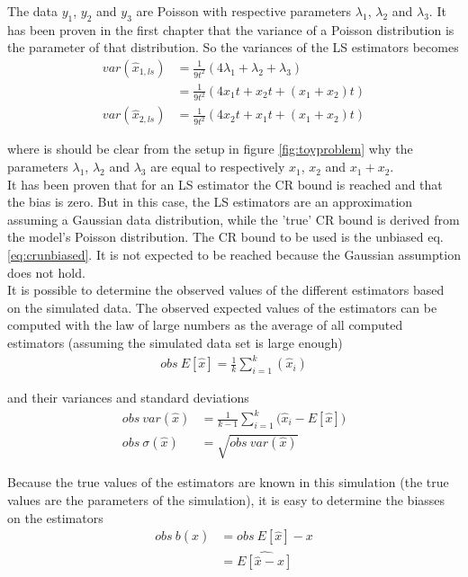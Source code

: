 \documentclass[report,12pt]{report}
\begin{document}
The data $y_1$, $y_2$ and $y_3$ are Poisson with respective parameters $\lambda_1$, $\lambda_2$ and $\lambda_3$. It has been proven in the first chapter that the variance of a Poisson distribution is the parameter of that distribution. So the variances of the LS estimators becomes
\begin{align}
	var(\hat x_{1, ls}) &= \frac{1}{9 t^2} \left( 4 \lambda_1 + \lambda_2 + \lambda_3 \right)
	\nonumber\\
	&= \frac{1}{9 t^2} \left( 
	4 x_{1}t + x_{2}t + 
	(x_{1} + x_{2})t 
	\right)
	\\
	var(\hat x_{2, ls }) &= \frac{1}{9 t^2} \left( 
	4 x_{2}t + x_{1}t + 
	(x_{1} + x_{2})t 
	\right)
\end{align}

where is should be clear from the setup in figure \ref{fig:toyproblem} why the parameters $\lambda_1$, $\lambda_2$ and $\lambda_3$ are equal to respectively $x_1$, $x_2$ and $x_1 + x_2$.\\

It has been proven that for an LS estimator the CR bound is reached and that the bias is zero. But in this case, the LS estimators are an approximation assuming a Gaussian data distribution, while the 'true' CR bound is derived from the model's Poisson distribution. The CR bound to be used is the unbiased eq. \ref{eq:crunbiased}. It is not expected to be reached because the Gaussian assumption does not hold.\\

It is possible to determine the observed values of the different estimators based on the simulated data. The observed expected values of the estimators can be computed with the law of large numbers as the average of all computed estimators (assuming the simulated data set is large enough)
\begin{align}
	obs\ E[\hat x] = \frac{1}{k} \sum_{i=1}^{k} \left(\hat x_i \right)
\end{align}

and their variances and standard deviations
\begin{align}
	obs\ var(\hat x) &= \frac{1}{k-1} \sum_{i=1}^{k}
	\big(\hat x_i - E[\hat x]\big)
	\\
	obs\ \sigma(\hat x) &= \sqrt{obs\ var(\hat x)}
	\label{eq:variance}
\end{align}

Because the true values of the estimators are known in this simulation (the true values are the parameters of the simulation), it is easy to determine the biasses on the estimators
\begin{align}	
	obs\ b(\hat x) &= obs\ E[\hat x] - x
	\nonumber\\
	&= \widehat{E[\hat x - x]}
\end{align}
\end{document}
